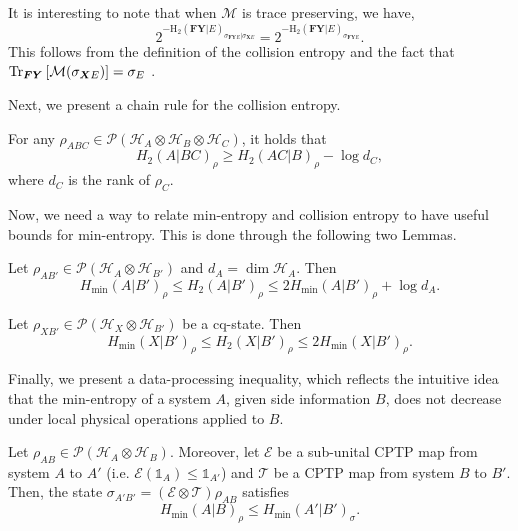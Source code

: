 It is interesting to note that when $\mathcal{M}$ is trace preserving, we have,
$$2^{-\text{H}_2(\mathbf{F}\mathbf{Y} | E)_{\sigma_{\mathbf{F}\mathbf{Y}E} | \sigma_{\mathbf{X}E}}} = 2^{-\text{H}_2(\mathbf{F}\mathbf{Y} | E)_{\sigma_{\mathbf{F}\mathbf{Y}E}}}.$$
This follows from the definition of the collision entropy and the fact that $\Tr_{\bm{F} \bm{Y}}\left[ \mathcal{M}(\sigma_{\bm{X} E}) \right] = \sigma_{E}$ \citep{Dupuis2015}. 



Next, we present a chain rule for the collision entropy.

\begin{lemma}
For any $\rho_{ABC}\in\mathcal{P}(\mathcal{H}_A\otimes\mathcal{H}_B\otimes\mathcal{H}_C)$, it holds that
$$H_2(A|BC)_{\rho} \geq H_2(AC|B)_{\rho} - \log d_C,$$
where $d_C$ is the rank of $\rho_C$.
\label{lemma:chain_rule}
\end{lemma}

Now, we need a way to relate min-entropy and collision entropy to have useful bounds for min-entropy. This is done through the following two Lemmas.

\begin{lemma}
\label{lemma:quantumrelation}
Let $\rho_{A B'}\in\mathcal{P}(\mathcal{H}_A \otimes \mathcal{H}_{B'})$ and $d_A = \dim\mathcal{H}_A$. Then
$$H_{\min}(A|B')_{\rho} \leq H_2(A|B')_{\rho} \leq 2 H_{\min}(A|B')_{\rho} + \log d_A.$$
\end{lemma}

\begin{lemma}
\label{lemma:classicalquantumrelation}
Let $\rho_{X B'}\in\mathcal{P}(\mathcal{H}_X \otimes \mathcal{H}_{B'})$ be a cq-state. Then
$$H_{\min}(X|B')_{\rho} \leq H_2(X|B')_{\rho} \leq 2 H_{\min}(X|B')_{\rho}.$$
\end{lemma}

Finally, we present a data-processing inequality, which reflects the intuitive idea that the min-entropy of a system $A$, given side information $B$, does not decrease under local physical operations applied to $B$.

\begin{lemma}
\label{lemma:data_processing_inequality}
Let $\rho_{A B}\in\mathcal{P}(\mathcal{H}_A \otimes \mathcal{H}_{B})$. Moreover, let $\mathcal{E}$ be a sub-unital CPTP map from system $A$ to $A'$ (i.e. $\mathcal{E}(\mathds{1}_A) \leq \mathds{1}_{A'}$) and $\mathcal{T}$ be a CPTP map from system $B$ to $B'$. Then, the state $\sigma_{A' B'} = \left(\mathcal{E}\otimes \mathcal{T}  \right)\rho_{AB}$ satisfies
$$H_{\min}(A|B)_{\rho}\leq H_{\min}(A'|B')_{\sigma}.$$
\end{lemma}

